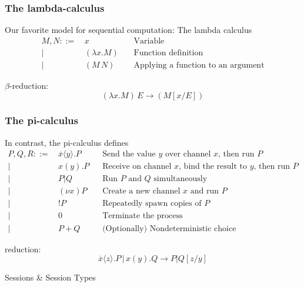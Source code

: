\documentclass[12pt]{beamer}
\begin{document}
\begin{frame}
\frametitle{The lambda-calculus}

Our favorite model for sequential computation: The lambda calculus 
\begingroup
\fontsize{10pt}{12pt}\selectfont
\begin{align*}
M, N ::= \, & x \,\,\, \, \, & \text{Variable}\\
|\,\,\, & (\lambda x. M) \,\,\, \, \, &\text{Function definition}\\
|\,\,\, & (M\, N) \,\,\, \, \, \, \, \, \, &\text{Applying a function to an argument} 
\end{align*}
\endgroup



$\beta$-reduction: 
$$(\lambda x. M) \, E \rightarrow (M[x/E])$$


\end{frame}

\begin{frame}
\frametitle{The pi-calculus}
In contrast, the pi-calculus defines
\begingroup
\fontsize{10pt}{12pt}\selectfont
\begin{align*}
P, Q, R ::= \, & \overline{x} \langle y \rangle.P \,\,\, \, \, &\text{Send the value }y\text{ over channel }x\text{, then run }P \\
|\,\,\, & x(y).P \,\,\, \, \, & \text{Receive on channel }x\text{, bind the result to }y\text{, then run }P \\
|\,\,\, & P|Q \,\,\, \, \, \, \, \, \, &\text{Run }P\text{ and }Q\text{ simultaneously} \\
|\,\,\, & (\nu x)P  \,\,\, &\text{Create a new channel }x\text{ and run }P \\
|\,\,\, & !P \,\,\, &\text{Repeatedly spawn copies of }P \\
|\,\,\, & 0 & \text{Terminate the process} \\
|\,\,\, & P + Q & \text{(Optionally) Nondeterministic choice}
\end{align*}
\endgroup


reduction: 
$$\overline{x}\langle z \rangle.P\, |\, x(y).Q \rightarrow P | Q[z/y]$$


\end{frame}


\begin{frame}
\begin{center}
    \LARGE{Sessions \& Session Types} 
\end{center}
\end{frame}
\end{document}
